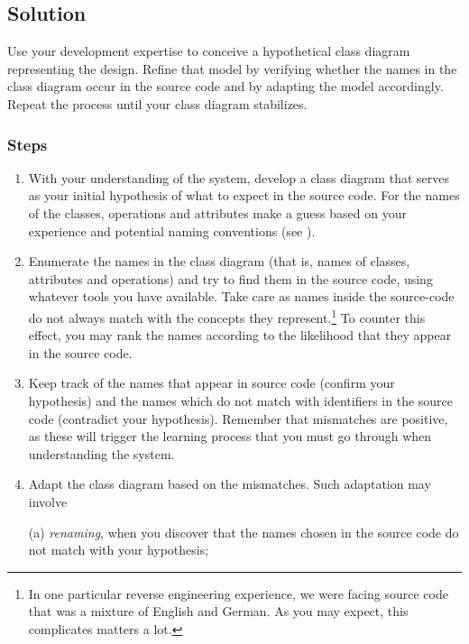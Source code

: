 \documentclass[a4paper,10pt,twoside]{book}
\begin{document}
\subsection*{Solution}

Use your development expertise to conceive a hypothetical class diagram representing the 
design. Refine that model by verifying whether the names in the class diagram occur in the 
source code and by adapting the model accordingly. Repeat the process until your class 
diagram stabilizes.

\subsubsection*{Steps}
\begin{enumerate}
  \item With your understanding of the system, develop a class diagram that serves as your 
initial hypothesis of what to expect in the source code. For the names of the classes, 
operations and attributes make a guess based on your experience and potential naming 
conventions (see ).

  \item Enumerate the names in the class diagram (that is, names of classes, attributes and 
operations) and try to find them in the source code, using whatever tools you have 
available. Take care as names inside the source-code do not always match with the concepts 
they represent.\footnote{In one particular reverse engineering experience, we were facing 
source code that was a mixture of English and German. As you may expect, this complicates 
matters a lot.} To counter this effect, you may rank the names according to the likelihood 
that they appear in the source code.

  \item Keep track of the names that appear in source code (confirm your hypothesis) and 
the names which do not match with identifiers in the source code (contradict your 
hypothesis). Remember that mismatches are positive, as these will trigger the learning 
process that you must go through when understanding the system.

  \item Adapt the class diagram based on the mismatches. Such adaptation may involve

(a) \emph{renaming}, when you discover that the names chosen in the source code do not 
match with your hypothesis;


\end{enumerate}
\end{document}
